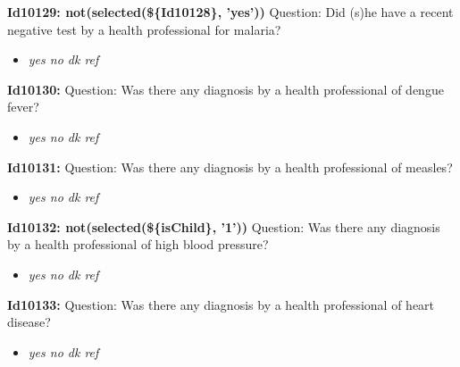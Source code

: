 \documentclass{article}%
\begin{document}
\textbf{Id10129: not(selected(\$\{Id10128\}, 'yes'))\newline%
}%
Question: Did (s)he have a recent negative test by a health professional for malaria?\newline%
%
\begin{itemize}%
\item%
\textit{yes\newline%
 no\newline%
 dk\newline%
 ref\newline%
}%
\end{itemize}%
\textbf{Id10130: \newline%
}%
Question: Was there any diagnosis by a health professional of dengue fever?\newline%
%
\begin{itemize}%
\item%
\textit{yes\newline%
 no\newline%
 dk\newline%
 ref\newline%
}%
\end{itemize}%
\textbf{Id10131: \newline%
}%
Question: Was there any diagnosis by a health professional of measles?\newline%
%
\begin{itemize}%
\item%
\textit{yes\newline%
 no\newline%
 dk\newline%
 ref\newline%
}%
\end{itemize}%
\textbf{Id10132: not(selected(\$\{isChild\}, '1'))\newline%
}%
Question: Was there any diagnosis by a health professional of high blood pressure?\newline%
%
\begin{itemize}%
\item%
\textit{yes\newline%
 no\newline%
 dk\newline%
 ref\newline%
}%
\end{itemize}%
\textbf{Id10133: \newline%
}%
Question: Was there any diagnosis by a health professional of heart disease?\newline%
%
\begin{itemize}%
\item%
\textit{yes\newline%
 no\newline%
 dk\newline%
 ref\newline%
}%
\end{itemize}%
\end{document}
